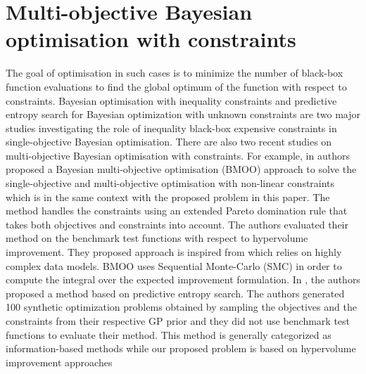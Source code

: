 \section{Multi-objective Bayesian optimisation with constraints}
The goal of optimisation in such cases is to minimize the number of black-box function evaluations to find the global optimum of the function with respect to constraints. Bayesian optimisation with inequality constraints \cite{gardner2014bayesian} and predictive entropy search for Bayesian optimization with unknown constraints \cite{garrido2016predictive} are two major studies investigating the role of inequality black-box expensive constraints in single-objective Bayesian optimisation. There are also two recent studies on multi-objective Bayesian optimisation with constraints.
For example, in \cite{feliot2017bayesian} authors proposed a Bayesian multi-objective optimisation (BMOO) approach to solve the single-objective and multi-objective optimisation with non-linear constraints which is in the same context with the proposed problem in this paper. The method handles
the constraints using an extended Pareto domination rule that takes both objectives and constraints into account. The authors evaluated their method on the benchmark test functions with respect to hypervolume improvement. They proposed approach is inspired from \cite{oyama2007new} which relies on highly complex data models. BMOO uses Sequential Monte-Carlo (SMC) in order to compute the integral over the expected improvement formulation. In \cite{garrido2016predictive}, the authors proposed a method based on predictive entropy search. The authors generated 100 synthetic optimization
problems obtained by sampling the objectives and the constraints from their respective GP prior and they did not use benchmark test functions to evaluate their method. This method is generally categorized as information-based methods while our proposed problem is based on hypervolume improvement approaches

